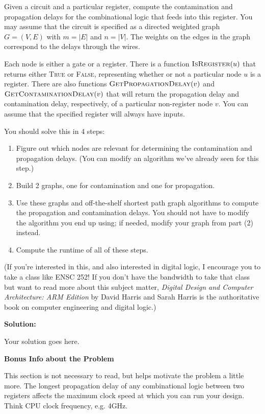 \documentclass[12pt]{article}
\begin{document}
Given a circuit and a particular register, compute the contamination and propagation delays for the combinational logic that feeds into this register.
You may assume that the circuit is specified as a directed weighted graph $G = (V, E)$ with $m = |E|$ and $n = |V|$.
The weights on the edges in the graph correspond to the delays through the wires.

Each node is either a gate or a register.
There is a function $\textsc{IsRegister}(u)$ that returns either \textsc{True} or \textsc{False}, representing whether or not a particular node $u$ is a register.
There are also functions $\textsc{GetPropagationDelay}(v)$ and $\textsc{GetContaminationDelay}(v)$ that will return the propagation delay and contamination delay, respectively, of a particular non-register node $v$.
You can assume that the specified register will always have inputs.

You should solve this in 4 steps:
\begin{enumerate}
  \item Figure out which nodes are relevant for determining the contamination and propagation delays. (You can modify an algorithm we've already seen for this step.)
  \item Build 2 graphs, one for contamination and one for propagation.
  \item Use these graphs and off-the-shelf shortest path graph algorithms to compute the propagation and contamination delays. You should not have to modify the algorithm you end up using; if needed, modify your graph from part (2) instead.
  \item Compute the runtime of all of these steps.
\end{enumerate}

(If you're interested in this, and also interested in digital logic, I encourage you to take a class like ENSC 252! If you don't have the bandwidth to take that class but want to read more about this subject matter, \textit{Digital Design and Computer Architecture: ARM Edition} by David Harris and Sarah Harris is the authoritative book on computer engineering and digital logic.)


\textbf{Solution:}

Your solution goes here.

\bigbreak
\bigbreak
\bigbreak
\bigbreak
\bigbreak

\textbf{Bonus Info about the Problem}

This section is not necessary to read, but helps motivate the problem a little more.
The longest propagation delay of any combinational logic between two registers affects the maximum clock speed at which you can run your design.
Think CPU clock frequency, e.g. 4GHz.
\end{document}
